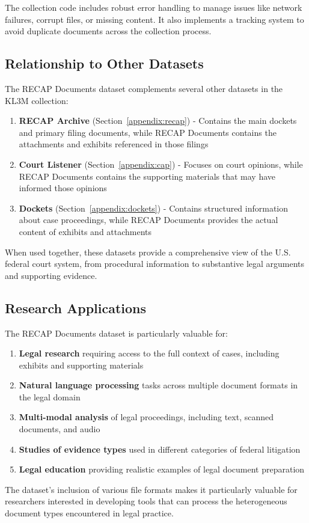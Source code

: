 The collection code includes robust error handling to manage issues like network failures, corrupt files, or missing content. It also implements a tracking system to avoid duplicate documents across the collection process.

\subsection{Relationship to Other Datasets}

The RECAP Documents dataset complements several other datasets in the KL3M collection:

\begin{enumerate}
    \item \textbf{RECAP Archive} (Section~\ref{appendix:recap}) - Contains the main dockets and primary filing documents, while RECAP Documents contains the attachments and exhibits referenced in those filings
    \item \textbf{Court Listener} (Section~\ref{appendix:cap}) - Focuses on court opinions, while RECAP Documents contains the supporting materials that may have informed those opinions
    \item \textbf{Dockets} (Section~\ref{appendix:dockets}) - Contains structured information about case proceedings, while RECAP Documents provides the actual content of exhibits and attachments
\end{enumerate}

When used together, these datasets provide a comprehensive view of the U.S. federal court system, from procedural information to substantive legal arguments and supporting evidence.

\subsection{Research Applications}

The RECAP Documents dataset is particularly valuable for:

\begin{enumerate}
    \item \textbf{Legal research} requiring access to the full context of cases, including exhibits and supporting materials
    \item \textbf{Natural language processing} tasks across multiple document formats in the legal domain
    \item \textbf{Multi-modal analysis} of legal proceedings, including text, scanned documents, and audio
    \item \textbf{Studies of evidence types} used in different categories of federal litigation
    \item \textbf{Legal education} providing realistic examples of legal document preparation
\end{enumerate}

The dataset's inclusion of various file formats makes it particularly valuable for researchers interested in developing tools that can process the heterogeneous document types encountered in legal practice.